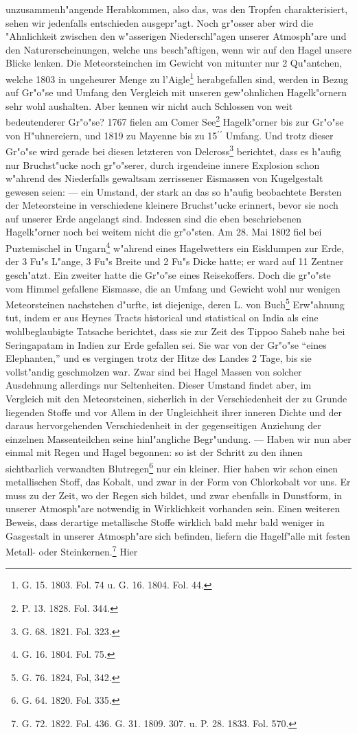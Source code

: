 \documentclass[a4paper, 8pt, oneside, polutonikogreek, german]{article}
\begin{document}
unzusammenh"angende Herabkommen, also das, was den Tropfen charakterisiert, sehen wir jedenfalls entschieden ausgepr"agt. Noch gr"osser aber wird die "Ahnlichkeit zwischen den w"asserigen Niederschl"agen unserer Atmosph"are und den Naturerscheinungen, welche uns besch"aftigen, wenn wir auf den Hagel unsere Blicke lenken. Die Meteorsteinchen im Gewicht von mitunter nur 2 Qu"antchen, welche 1803 in ungeheurer Menge zu l'Aigle\footnote{G. 15. 1803. Fol. 74 u. G. 16. 1804. Fol. 44.} herabgefallen sind, werden in Bezug auf Gr"o"se und Umfang den Vergleich mit unseren gew"ohnlichen Hagelk"ornern sehr wohl aushalten. Aber kennen wir nicht auch Schlossen von weit bedeutenderer Gr"o"se? 1767 fielen am Comer See\footnote{P. 13. 1828. Fol. 344.} Hagelk"orner bis zur Gr"o"se von H"uhnereiern, und 1819 zu Mayenne bis zu 15$^\prime$$^\prime$ Umfang. Und trotz dieser Gr"o"se wird gerade bei diesen letzteren von Delcross\footnote{G. 68. 1821. Fol. 323.} berichtet, dass es h"aufig nur Bruchst"ucke noch gr"o"serer, durch irgendeine innere Explosion schon w"ahrend des Niederfalls gewaltsam zerrissener Eismassen von Kugelgestalt gewesen seien: --- ein Umstand, der stark an das so h"aufig beobachtete Bersten der Meteorsteine in verschiedene kleinere Bruchst"ucke erinnert, bevor sie noch auf unserer Erde angelangt sind. Indessen sind die eben beschriebenen Hagelk"orner noch bei weitem nicht die gr"o"sten. Am 28. Mai 1802 fiel bei Puztemischel in Ungarn\footnote{G. 16. 1804. Fol. 75.} w"ahrend eines Hagelwetters ein Eisklumpen zur Erde, der 3 Fu"s L"ange, 3 Fu"s Breite und 2 Fu"s Dicke hatte; er ward auf 11 Zentner gesch"atzt. Ein zweiter hatte die Gr"o"se eines Reisekoffers. Doch die gr"o"ste vom Himmel gefallene Eismasse, die an Umfang und Gewicht wohl nur wenigen Meteorsteinen nachstehen d"urfte, ist diejenige, deren L. von Buch\footnote{G. 76. 1824, Fol, 342.} Erw"ahnung tut, indem er aus Heynes Tracts historical und statistical on India als eine wohlbeglaubigte Tatsache berichtet, dass sie zur Zeit des Tippoo Saheb nahe bei Seringapatam in Indien zur Erde gefallen sei. Sie war von der Gr"o"se "`eines Elephanten,"' und es vergingen trotz der Hitze des Landes 2 Tage, bis sie vollst"andig geschmolzen war. Zwar sind bei Hagel Massen von solcher Ausdehnung allerdings nur Seltenheiten. Dieser Umstand findet aber, im Vergleich mit den Meteorsteinen, sicherlich in der Verschiedenheit der zu Grunde liegenden Stoffe und vor Allem in der Ungleichheit ihrer inneren Dichte und der daraus hervorgehenden Verschiedenheit in der gegenseitigen Anziehung der einzelnen Massenteilchen seine hinl"angliche Begr"undung. --- Haben wir nun aber einmal mit Regen und Hagel begonnen: so ist der Schritt zu den ihnen sichtbarlich verwandten Blutregen\footnote{G. 64. 1820. Fol. 335.} nur ein kleiner. Hier haben wir schon einen metallischen Stoff, das Kobalt, und zwar in der Form von Chlorkobalt vor uns. Er muss zu der Zeit, wo der Regen sich bildet, und zwar ebenfalls in Dunstform, in unserer Atmosph"are notwendig in Wirklichkeit vorhanden sein. Einen weiteren Beweis, dass derartige metallische Stoffe wirklich bald mehr bald weniger in Gasgestalt in unserer Atmosph"are sich befinden, liefern die Hagelf"alle mit festen Metall- oder Steinkernen.\footnote{G. 72. 1822. Fol. 436. G. 31. 1809. 307. u. P. 28. 1833. Fol. 570.} Hier 
\end{document}
